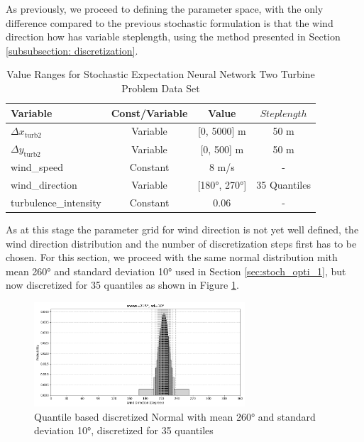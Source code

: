 \documentclass[preprint,12pt]{elsarticle}
\begin{document}
As previously, we proceed to defining the parameter space, with the only difference compared to the previous stochastic formulation is that the wind direction how has variable steplength, using the method presented in Section \ref{subsubsection: discretization}.

\begin{table}[ht]
	\centering
	\caption{Value Ranges for Stochastic Expectation Neural Network Two Turbine Problem Data Set}
	\begin{tabular}{|l|c|c|c|}
		\hline
		\textbf{Variable} & \textbf{Const/Variable} & \textbf{Value} & \textbf{$Steplength$}\\
		\hline
		$\Delta x_{\text{turb2}}$ & Variable & [0, 5000] m & 50 m\\
		$\Delta y_{\text{turb2}}$ & Variable & [0, 500] m  & 50 m\\
		wind\_speed & Constant & 8 m/s & -\\
		wind\_direction & Variable & [180°, 270°]& 35 Quantiles \\
		turbulence\_intensity & Constant & 0.06 & - \\
		\hline
	\end{tabular}
	\label{tab:val_prob2_data}
\end{table}

As at this stage the parameter grid for wind direction is not yet well defined, the wind direction distribution and the number of discretization steps first has to be chosen. For this section, we proceed with the same normal distribution mith mean 260° and standard deviation 10° used in Section \ref{sec:stoch_opti_1}, but now discretized for 35 quantiles as shown in Figure \ref{fig:stoch2_dist}.


\begin{figure}[h] 
	\centering
	\includegraphics[width=0.7\textwidth]{../figures/optimization/stoch2/dist_discret.png} 
	\caption{Quantile based discretized Normal with mean 260° and standard deviation 10°, discretized for 35 quantiles}
	\label{fig:stoch2_dist}
\end{figure} 
\end{document}
